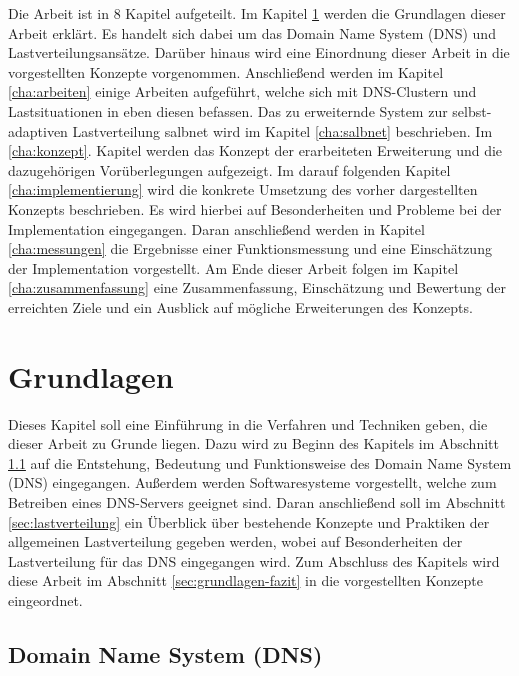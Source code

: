 \documentclass[a4paper, 12pt, BCOR10mm, DIV12, toc=bibliography, toc=listof, german]{scrbook}
\def \dns {Domain Name System (DNS)}
\begin{document}
		Die Arbeit ist in 8 Kapitel aufgeteilt. Im Kapitel \ref{cha:grundlagen} werden die Grundlagen
		dieser Arbeit erklärt. Es handelt sich dabei um das \dns{} und Lastverteilungsansätze.  Darüber
		hinaus wird eine Einordnung dieser Arbeit in die vorgestellten Konzepte vorgenommen.
		Anschließend werden im Kapitel \ref{cha:arbeiten} einige Arbeiten aufgeführt, welche sich mit
		DNS-Clustern und Lastsituationen in eben diesen befassen. Das zu erweiternde System zur
		selbst-adaptiven Lastverteilung salbnet \cite{zinke2012,salbnet} wird im Kapitel
		\ref{cha:salbnet} beschrieben.  Im \ref{cha:konzept}. Kapitel werden das Konzept der
		erarbeiteten Erweiterung und die dazugehörigen Vorüberlegungen aufgezeigt.  Im darauf folgenden
		Kapitel \ref{cha:implementierung} wird die konkrete Umsetzung des vorher dargestellten Konzepts
		beschrieben.  Es wird hierbei auf Besonderheiten und Probleme bei der Implementation
		eingegangen.  Daran anschließend werden in Kapitel \ref{cha:messungen} die Ergebnisse einer
		Funktionsmessung und eine Einschätzung der Implementation vorgestellt. Am Ende dieser Arbeit
		folgen im Kapitel \ref{cha:zusammenfassung} eine Zusammenfassung, Einschätzung und Bewertung der
		erreichten Ziele und ein Ausblick auf mögliche Erweiterungen des Konzepts.


	\chapter{Grundlagen} %
	\label{cha:grundlagen}

		Dieses Kapitel soll eine Einführung in die Verfahren und Techniken geben, die dieser Arbeit
		zu Grunde liegen.  Dazu wird zu Beginn des Kapitels im Abschnitt \ref{sec:dns} auf die Entstehung,
		Bedeutung und Funktionsweise des \dns{} eingegangen. Außerdem werden Softwaresysteme
		vorgestellt, welche zum Betreiben eines DNS-Servers geeignet sind. Daran anschließend soll im
		Abschnitt \ref{sec:lastverteilung} ein Überblick über bestehende Konzepte und Praktiken der
		allgemeinen Lastverteilung gegeben werden, wobei auf Besonderheiten der Lastverteilung für das
		DNS eingegangen wird. Zum Abschluss des Kapitels wird diese Arbeit im Abschnitt
		\ref{sec:grundlagen-fazit} in die vorgestellten Konzepte eingeordnet.

		\section{\dns{}} %
		\label{sec:dns}
\end{document}
